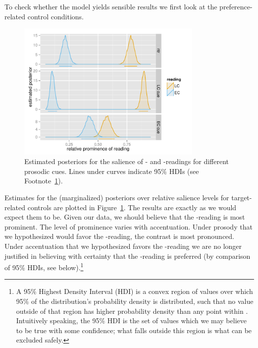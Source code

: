 \documentclass[fleqn,reqno,10pt]{article}
\newcommand{\lc}{\acro{lc}}
\newcommand{\ec}{\acro{ec}}
\begin{document}
To check whether the model yields sensible results we first look at
the preference-related control conditions.
%
\begin{figure}
  \centering
  \includegraphics[width=0.8\textwidth]{pics/post_salience_TF.pdf}
  \caption{Estimated posteriors for the salience of \lc- and
    \ec-readings for different prosodic cues. Lines under curves
    indicate 95\% HDIs (see Footnote~\ref{fn:HDI}).}
  \label{fig:Posterior_TF}
\end{figure}
%
Estimates for the (marginalized) posteriors over relative salience
levels for target-related controls are plotted in
Figure~\ref{fig:Posterior_TF}. The results are exactly as we would
expect them to be. Given our data, we should believe that the
\lc-reading is most prominent. The level of prominence varies with
accentuation. Under prosody that we hypothesized would favor the
\lc-reading, the contrast is most pronounced. Under accentuation that
we hypothesized favors the \ec-reading we are no longer justified in
believing with certainty that the \lc-reading is preferred (by
comparison of 95\% HDIs, see below).\footnote{\label{fn:HDI} A 95\%
  Highest Density Interval (HDI) is a convex region of values over
  which 95\% of the distribution's probability density is distributed,
  such that no value outside of that region has higher probability
  density than any point within
  \citep{Kruschke2011:Doing-Bayesian-}. Intuitively speaking, the 95\%
  HDI is the set of values which we may believe to be true with some
  confidence; what falls outside this region is what can be excluded
  safely.}
\end{document}
